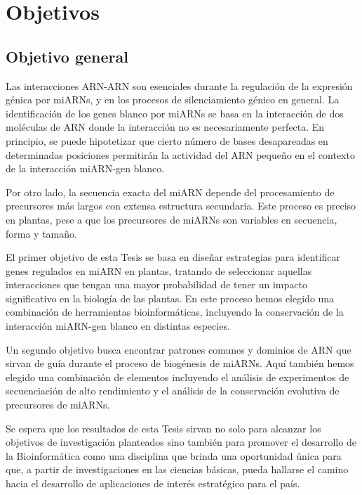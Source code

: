\setcounter{chapter}{2}
\chapter*{Objetivos} 
\setcounter{figure}{0}
\setcounter{section}{0}

\section{Objetivo general} 

Las interacciones ARN-ARN son esenciales durante la regulación de la expresión génica por miARNs, y en los procesos de silenciamiento génico en general.
La identificación de los genes blanco por miARNs se basa en la interacción de dos moléculas de ARN donde la interacción no es necesariamente perfecta. 
En principio, se puede hipotetizar que cierto número de bases desapareadas en determinadas posiciones permitirán la actividad del ARN pequeño en el contexto de la interacción miARN-gen blanco. 

Por otro lado, la secuencia exacta del miARN depende del procesamiento de precursores más largos con extensa estructura secundaria.
Este proceso es preciso en plantas, pese a que los precursores de miARNs son variables en secuencia, forma y tamaño.

El primer objetivo de esta Tesis se basa en diseñar estrategias para identificar genes regulados en miARN en plantas, tratando de seleccionar aquellas interacciones que tengan una mayor probabilidad de tener un impacto significativo en la biología de las plantas.
En este proceso hemos elegido una combinación de herramientas bioinformáticas, incluyendo la conservación de la interacción miARN-gen blanco en distintas especies.

Un segundo objetivo busca encontrar patrones comunes y dominios de ARN que sirvan de guía durante el proceso de biogénesis de miARNs.
Aquí también hemos elegido una combinación de elementos incluyendo el análisis de experimentos de secuenciación de alto rendimiento y el análisis de la conservación evolutiva de precursores de miARNs.

Se espera que los resultados de esta Tesis sirvan no solo para alcanzar los objetivos de investigación planteados sino también para promover el desarrollo de la Bioinformática como una disciplina que brinda una oportunidad única para que, a partir de investigaciones en las ciencias básicas, pueda hallarse el camino hacia el desarrollo de aplicaciones de interés estratégico para el país.


